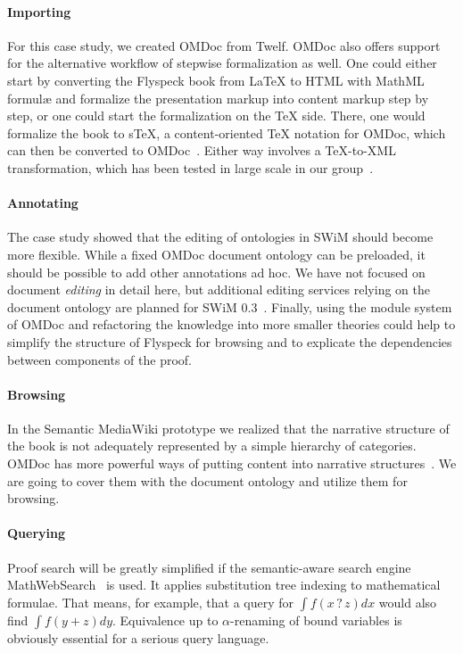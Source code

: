 \begin{discussion}
\paragraph{Importing} For this case study, we created OMDoc from Twelf. OMDoc
also offers support for the alternative workflow of stepwise formalization as
well.  One could either start by converting the Flyspeck book from {\LaTeX} to
HTML with MathML formulæ and formalize the presentation markup into content
markup step by step, or one could start the formalization on the {\TeX} side.
There, one would formalize the book to s\TeX{}, a content-oriented {\TeX}
notation for OMDoc, which can then be converted to
OMDoc~\cite{Kohlhase:albwo06}.  Either way involves a {\TeX}-to-XML
transformation, which has been tested in large scale in our
group~\cite{URL:arXMLiv}.

\paragraph{Annotating} The case study showed that the editing of ontologies in
SWiM should become more flexible.  While a fixed OMDoc document ontology can be
preloaded, it should be possible to add other annotations ad hoc.  We have not
focused on document \emph{editing} in detail here, but additional editing
services relying on the document ontology are planned for SWiM
0.3~\cite{swim-roadmap,Lange:SWiMSciColl07}.  Finally, using the module system
of OMDoc and refactoring the knowledge into more smaller theories could help to
simplify the structure of Flyspeck for browsing and to explicate the
dependencies between components of the proof.

\paragraph{Browsing} In the Semantic MediaWiki prototype we realized that the
narrative structure of the book is not adequately represented by a simple
hierarchy of categories.  OMDoc has more powerful ways of putting content into
narrative structures~\cite{KohMueMue:dfncimk07}.  We are going to cover them with
the document ontology and utilize them for browsing.

\paragraph{Querying} Proof search will be greatly simplified if
the semantic-aware search engine MathWebSearch~\cite{KohSuc:asemf06} is
used.  It applies substitution tree indexing to mathematical formulae.
That means, for example, that a query for $\int f(x\mathop{?}z) dx$
would also find $\int f(y+z) dy$.  Equivalence up to
$\alpha$-renaming of bound variables is obviously essential for a serious query
language.


\end{discussion}
